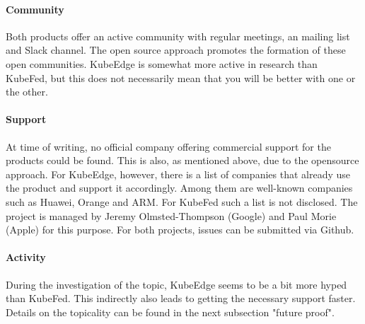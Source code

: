 \documentclass[MIC,Master,english]{twbook}%
\begin{document}
\paragraph{Community} Both products offer an active community with regular meetings, an mailing list and Slack channel. The open source approach promotes the formation of these open communities. KubeEdge is somewhat more active in research than KubeFed, but this does not necessarily mean that you will be better with one or the other.

\paragraph{Support} At time of writing, no official company offering commercial support for the products could be found. This is also, as mentioned above, due to the opensource approach. For KubeEdge, however, there is a list of companies that already use the product and support it accordingly. Among them are well-known companies such as Huawei, Orange and ARM. For KubeFed such a list is not disclosed. The project is managed by Jeremy Olmsted-Thompson (Google) and Paul Morie (Apple) for this purpose. For both projects, issues can be submitted via Github.

\paragraph{Activity} During the investigation of the topic, KubeEdge seems to be a bit more hyped than KubeFed. This indirectly also leads to getting the necessary support faster. Details on the topicality can be found in the next subsection "future proof".
\end{document}
